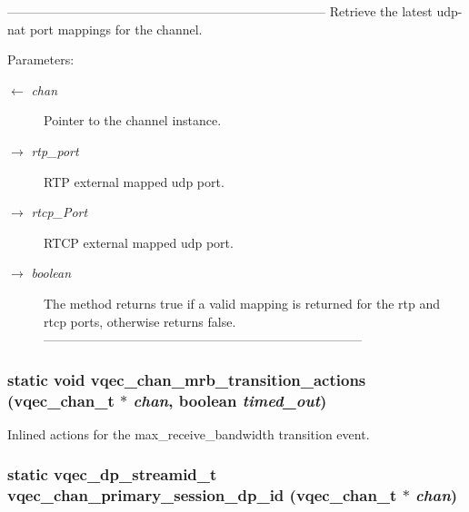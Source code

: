 --------------------------------------------------------------------------- Retrieve the latest udp-nat port mappings for the channel.

\begin{Desc}
\item[Parameters:]
\begin{description}
\item[\mbox{$\leftarrow$} {\em chan}]Pointer to the channel instance. \item[\mbox{$\rightarrow$} {\em rtp\_\-port}]RTP external mapped udp port. \item[\mbox{$\rightarrow$} {\em rtcp\_\-Port}]RTCP external mapped udp port. \item[\mbox{$\rightarrow$} {\em boolean}]The method returns true if a valid mapping is returned for the rtp and rtcp ports, otherwise returns false. --------------------------------------------------------------------------- \end{description}
\end{Desc}
\subsubsection{\setlength{\rightskip}{0pt plus 5cm}static void vqec\_\-chan\_\-mrb\_\-transition\_\-actions (\bf{vqec\_\-chan\_\-t} $\ast$ {\em chan}, boolean {\em timed\_\-out})\hspace{0.3cm}{\tt  [inline, static]}}\label{vqec__channel__private_8h_97137857115a13283af3acf7b6232551}


Inlined actions for the max\_\-receive\_\-bandwidth transition event. 
\subsubsection{\setlength{\rightskip}{0pt plus 5cm}static vqec\_\-dp\_\-streamid\_\-t vqec\_\-chan\_\-primary\_\-session\_\-dp\_\-id (\bf{vqec\_\-chan\_\-t} $\ast$ {\em chan})\hspace{0.3cm}{\tt  [inline, static]}}\label{vqec__channel__private_8h_1e567d73ad8f54d1fe0bf85be2151024}



